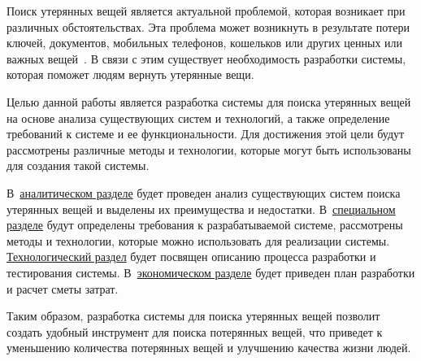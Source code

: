 \label{sec:introduction}

Поиск утерянных вещей является актуальной проблемой, которая возникает при различных обстоятельствах. Эта проблема может возникнуть в результате потери ключей, документов, мобильных телефонов, кошельков или других ценных или важных вещей~\cite{bib:m24_losts_article,bib:usinsk_losts_article}. В связи с этим существует необходимость разработки системы, которая поможет людям вернуть утерянные вещи.

Целью данной работы является разработка системы для поиска утерянных вещей на основе анализа существующих систем и технологий, а также определение требований к системе и ее функциональности. Для достижения этой цели будут рассмотрены различные методы и технологии, которые могут быть использованы для создания такой системы.

В~\hyperref[sec:analytics]{аналитическом разделе} будет проведен анализ существующих систем поиска утерянных вещей и выделены их преимущества и недостатки. В~\hyperref[sec:specials]{специальном разделе} будут определены требования к разрабатываемой системе, рассмотрены методы и технологии, которые можно использовать для реализации системы. \hyperref[sec:technology]{Технологический раздел} будет посвящен описанию процесса разработки и тестирования системы. В~\hyperref[sec:economy]{экономическом разделе} будет приведен план разработки и расчет сметы затрат.

Таким образом, разработка системы для поиска утерянных вещей позволит создать удобный инструмент для поиска потерянных вещей, что приведет к уменьшению количества потерянных вещей и улучшению качества жизни людей.